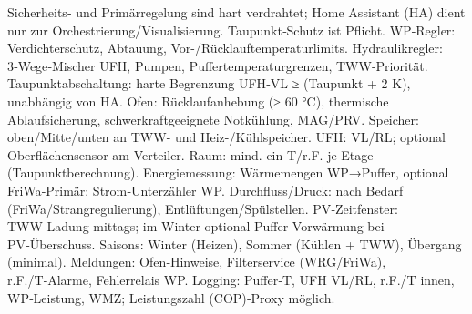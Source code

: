 \markdownRendererDocumentBegin
\markdownRendererSectionBegin
{}\markdownRendererInterblockSeparator
{}Sicherheits‑ und Primärregelung sind hart verdrahtet; Home Assistant (HA) dient nur zur Orchestrierung/Visualisierung. Taupunkt‑Schutz ist Pflicht.\markdownRendererInterblockSeparator
{}\markdownRendererSectionBegin
{}\markdownRendererInterblockSeparator
{}\markdownRendererUlBeginTight
\markdownRendererUlItem WP‑Regler: Verdichterschutz, Abtauung, Vor-/Rücklauftemperaturlimits.\markdownRendererUlItemEnd 
\markdownRendererUlItem Hydraulikregler: 3‑Wege‑Mischer UFH, Pumpen, Puffertemperaturgrenzen, TWW‑Priorität.\markdownRendererUlItemEnd 
\markdownRendererUlItem Taupunktabschaltung: harte Begrenzung UFH‑VL ≥ (Taupunkt + 2 K), unabhängig von HA.\markdownRendererUlItemEnd 
\markdownRendererUlItem Ofen: Rücklaufanhebung (≥ 60 °C), thermische Ablaufsicherung, schwerkraftgeeignete Notkühlung, MAG/PRV.\markdownRendererUlItemEnd 
\markdownRendererUlEndTight \markdownRendererInterblockSeparator
{}
\markdownRendererSectionEnd \markdownRendererSectionBegin
{}\markdownRendererInterblockSeparator
{}\markdownRendererUlBeginTight
\markdownRendererUlItem Speicher: oben/Mitte/unten an TWW- und Heiz-/Kühlspeicher.\markdownRendererUlItemEnd 
\markdownRendererUlItem UFH: VL/RL; optional Oberflächensensor am Verteiler.\markdownRendererUlItemEnd 
\markdownRendererUlItem Raum: mind. ein T/r.F. je Etage (Taupunktberechnung).\markdownRendererUlItemEnd 
\markdownRendererUlItem Energiemessung: Wärmemengen WP→Puffer, optional FriWa‑Primär; Strom‑Unterzähler WP.\markdownRendererUlItemEnd 
\markdownRendererUlItem Durchfluss/Druck: nach Bedarf (FriWa/Strangregulierung), Entlüftungen/Spülstellen.\markdownRendererUlItemEnd 
\markdownRendererUlEndTight \markdownRendererInterblockSeparator
{}
\markdownRendererSectionEnd \markdownRendererSectionBegin
{}\markdownRendererInterblockSeparator
{}\markdownRendererUlBeginTight
\markdownRendererUlItem PV‑Zeitfenster: TWW‑Ladung mittags; im Winter optional Puffer‑Vorwärmung bei PV‑Überschuss.\markdownRendererUlItemEnd 
\markdownRendererUlItem Saisons: Winter (Heizen), Sommer (Kühlen + TWW), Übergang (minimal).\markdownRendererUlItemEnd 
\markdownRendererUlItem Meldungen: Ofen‑Hinweise, Filterservice (WRG/FriWa), r.F./T‑Alarme, Fehlerrelais WP.\markdownRendererUlItemEnd 
\markdownRendererUlItem Logging: Puffer‑T, UFH VL/RL, r.F./T innen, WP‑Leistung, WMZ; Leistungszahl (COP)‑Proxy möglich.\markdownRendererUlItemEnd 

